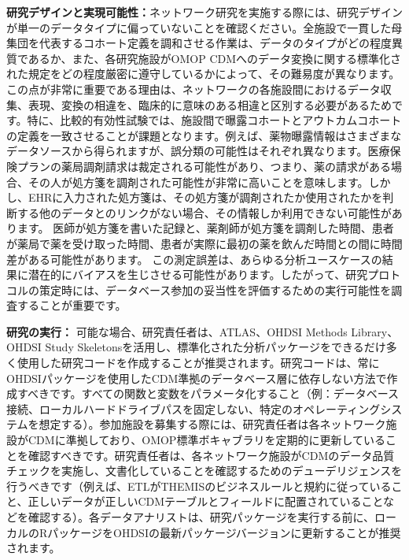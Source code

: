 \documentclass[
  11pt]{book}
\theoremstyle{definition}
\theoremstyle{definition}
\theoremstyle{definition}
\theoremstyle{definition}
\theoremstyle{remark}
\begin{document}
\textbf{研究デザインと実現可能性：}ネットワーク研究を実施する際には、研究デザインが単一のデータタイプに偏っていないことを確認ください。全施設で一貫した母集団を代表するコホート定義を調和させる作業は、データのタイプがどの程度異質であるか、また、各研究施設がOMOP CDMへのデータ変換に関する標準化された規定をどの程度厳密に遵守しているかによって、その難易度が異なります。この点が非常に重要である理由は、ネットワークの各施設間におけるデータ収集、表現、変換の相違を、臨床的に意味のある相違と区別する必要があるためです。特に、比較的有効性試験では、施設間で曝露コホートとアウトカムコホートの定義を一致させることが課題となります。例えば、薬物曝露情報はさまざまなデータソースから得られますが、誤分類の可能性はそれぞれ異なります。医療保険プランの薬局調剤請求は裁定される可能性があり、つまり、薬の請求がある場合、その人が処方箋を調剤された可能性が非常に高いことを意味します。しかし、EHRに入力された処方箋は、その処方箋が調剤されたか使用されたかを判断する他のデータとのリンクがない場合、その情報しか利用できない可能性があります。 医師が処方箋を書いた記録と、薬剤師が処方箋を調剤した時間、患者が薬局で薬を受け取った時間、患者が実際に最初の薬を飲んだ時間との間に時間差がある可能性があります。 この測定誤差は、あらゆる分析ユースケースの結果に潜在的にバイアスを生じさせる可能性があります。したがって、研究プロトコルの策定時には、データベース参加の妥当性を評価するための実行可能性を調査することが重要です。

\textbf{研究の実行：} 可能な場合、研究責任者は、ATLAS、OHDSI Methods Library、OHDSI Study Skeletonsを活用し、標準化された分析パッケージをできるだけ多く使用した研究コードを作成することが推奨されます。研究コードは、常にOHDSIパッケージを使用したCDM準拠のデータベース層に依存しない方法で作成すべきです。すべての関数と変数をパラメータ化すること（例：データベース接続、ローカルハードドライブパスを固定しない、特定のオペレーティングシステムを想定する）。参加施設を募集する際には、研究責任者は各ネットワーク施設がCDMに準拠しており、OMOP標準ボキャブラリを定期的に更新していることを確認すべきです。研究責任者は、各ネットワーク施設がCDMのデータ品質チェックを実施し、文書化していることを確認するためのデューデリジェンスを行うべきです（例えば、ETLがTHEMISのビジネスルールと規約に従っていること、正しいデータが正しいCDMテーブルとフィールドに配置されていることなどを確認する）。各データアナリストは、研究パッケージを実行する前に、ローカルのRパッケージをOHDSIの最新パッケージバージョンに更新することが推奨されます。
\end{document}
